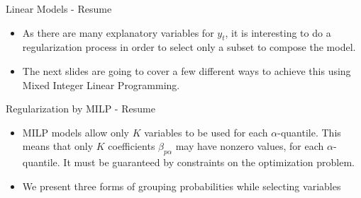 \documentclass[ignorenonframetext,]{beamer}
\begin{document}
\begin{frame}{Linear Models - Resume}

\begin{itemize}
\item
  As there are many explanatory variables for \(y_t\), it is interesting
  to do a regularization process in order to select only a subset to
  compose the model.
\item
  The next slides are going to cover a few different ways to achieve
  this using Mixed Integer Linear Programming.
\end{itemize}

\end{frame}


\begin{frame}{Regularization by MILP - Resume}

\begin{itemize}
\item
  MILP models allow only \(K\) variables to be used for each
  \(\alpha\)-quantile. This means that only \(K\) coefficients
  \(\beta_{p\alpha}\) may have nonzero values, for each
  \(\alpha\)-quantile. It must be guaranteed by constraints on the
  optimization problem.
\item
  We present three forms of grouping probabilities while selecting
  variables
\end{itemize}

\end{frame}
\end{document}
